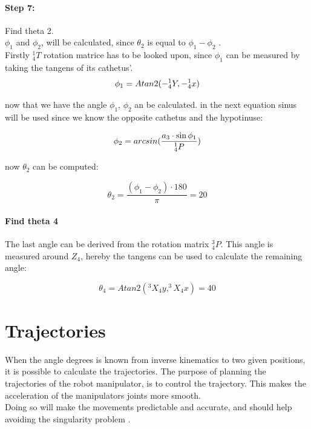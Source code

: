 \paragraph{Step 7:} Find theta 2.\\

$\phi_1$ and $\phi_2$, will be calculated, since $\theta_2$ is equal to $\phi_1-\phi_2$ .\\
Firstly $_4^1T$ rotation matrice has to be looked upon, since $\phi_1$ can be measured by taking the tangens of its cathetus'.
\begin{equation}
  \large  \phi_1 = Atan2(-_4^1Y,-_4^1x)
\end{equation}

now that we have the angle $\phi_1$, $\phi_2$ an be calculated.
in the next equation sinus will be used since we know the opposite cathetus and the hypotinuse:

\begin{equation}
   \large \phi_2 = arcsin(\frac{a_3\cdot\sin{\phi_1}}{_4^1P})
\end{equation}

now $\theta_2$ can be computed:

\begin{equation}
    \theta_2 = \frac{(\phi_1-\phi_2)\cdot180}{\pi}=20
\end{equation}

\paragraph{Find theta 4}

The last angle can be derived from the rotation matrix $_4^3P$. This angle is measured around $Z_4$, hereby the tangens can be used to calculate the remaining angle:

\begin{equation}
    \theta_4 = Atan2(^3X_4y, ^3X_4x) = 40
\end{equation}


\section{Trajectories}
When the angle degrees is known from inverse kinematics to two given positions, it is possible to calculate the trajectories. The purpose of planning the trajectories of the robot manipulator, is to control the trajectory. This makes the acceleration of the manipulators joints more smooth.\\
Doing so will make the movements predictable and accurate, and should help avoiding the singularity problem \cite{Trajectory}. 


